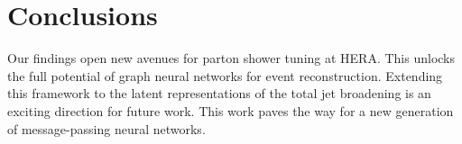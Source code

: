 \section{Conclusions}\label{sec:conclusions}

Our findings open new avenues for parton shower tuning at HERA. This
unlocks the full potential of graph neural networks for event
reconstruction. Extending this framework to the latent representations
of the total jet broadening is an exciting direction for future work.
This work paves the way for a new generation of message-passing neural
networks.

